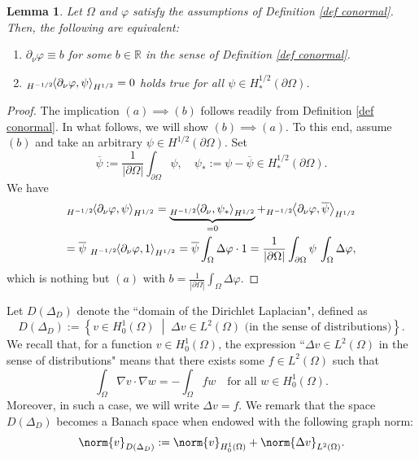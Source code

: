 \documentclass[a4paper,11pt]{article}
\newcommand\restr[2]{{%
\left.\kern-\nulldelimiterspace %
#1 %
\vphantom{|} %
\right|_{#2} %
}}
\newtheorem{lemma}[theorem]{Lemma}
\newcommand{\pairing}[2]{
{}_{{H^{-1/2}}}\hspace*{-1mm}\left\langle #1, #2\right\rangle_{H^{1/2}}
}  %
\newcommand\setbld[2]{\left\{ #1 \;\middle |\; #2\right\}}
\numberwithin{equation}{section}
\begin{document}
\begin{lemma}\label{lem equivalent conormal}
Let $\Omega$ and $\varphi$ satisfy the assumptions of Definition \ref{def conormal}. Then, the following are equivalent:
\begin{enumerate}[$(a)$]
    \item $\partial_\nu \varphi\equiv b$ for some $b\in \mathbb{R}$ in the sense of Definition \ref{def conormal}.
    \item $\pairing{\partial_\nu \varphi}{\psi}=0$ holds true for all $\psi\in H_*^{1/2}(\partial\Omega)$.
\end{enumerate}
\end{lemma}
\begin{proof} 
The implication $(a)\implies (b)$ follows readily from Definition \ref{def conormal}. In what follows, we will show $(b)\implies (a)$. To this end, assume $(b)$ and take an arbitrary $\psi\in H^{1/2}(\partial\Omega)$. Set
\begin{equation*}
    \overline\psi:=\frac{1}{|\partial\Omega|}\int_{\partial\Omega}\psi, \quad \psi_*:=\psi-\overline\psi\in H_*^{1/2}(\partial\Omega). 
\end{equation*}
We have
\begin{equation*}
 \begin{aligned}
 \pairing{\partial_\nu \varphi}{\psi}= \underbrace{\pairing{\partial_\nu}{\psi_*}}_{=0}+\pairing{\partial_\nu \varphi}{\overline{\psi}}\\
 =\overline{\psi}\ \pairing{\partial_\nu\varphi}{1} 
 = \overline{\psi}\int_{\Omega} \Delta \varphi \cdot 1 = \frac{1}{|\partial\Omega|} \int_{\partial\Omega}\psi \, \int_\Omega \Delta \varphi,
 \end{aligned}   
\end{equation*}
which is nothing but $(a)$ with $b= \frac{1}{|\partial\Omega|}\int_\Omega \Delta \varphi$.
\end{proof}

Let $D(\Delta_D)$ denote the ``domain of the Dirichlet Laplacian", defined as
\begin{equation*}
    D(\Delta_D):=\setbld{v\in H_0^1(\Omega)}{\Delta v \in L^2(\Omega) \text{ (in the sense of distributions)}}.
\end{equation*}
We recall that, for a function $v\in H_0^1(\Omega)$, the expression ``$\Delta v \in L^2(\Omega)$ in the sense of distributions" means that there exists some $f\in L^2(\Omega)$ such that
\begin{equation}\label{sense of distributions}
    \int_\Omega \nabla v \cdot \nabla w = -\int_\Omega f w \quad \text{for all }w\in H_0^1(\Omega).
\end{equation}
Moreover, in such a case, we will write $\Delta v=f$. 
We remark that the space $D(\Delta_D)$ becomes a Banach space when endowed with the following graph norm: 
\begin{equation*}
\norm{v}_{D(\Delta_D)}:=\norm{v}_{H_0^1(\Omega)}+\norm{\Delta v}_{L^2(\Omega)}.
\end{equation*}
\end{document}
